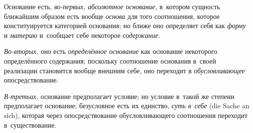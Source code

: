 Основание есть, {\em во-первых, абсолютное основание,} в~котором сущность
ближайшим образом есть вообще {\em основа} для того соотношения, которое
конституируется категорией основания; но ближе оно определяет себя как
{\em форму} и {\em материю} и~сообщает себе некоторое {\em содержание}.

{\em Во-вторых,} оно есть {\em определённое основание} как основание некоторого
определённого содержания; поскольку соотношение основания в~своей реализации
становится вообще внешним себе, оно переходит в {\em обусловливающее}
опосредствование.

{\em В-третьих,} основание предполагает условие; но условие в~такой же степени
предполагает основание; безусловное есть их единство, {\em суть в~себе}
(die Sache an sich), которая через опосредствование обусловливающего
соотношения переходит в~существование.


